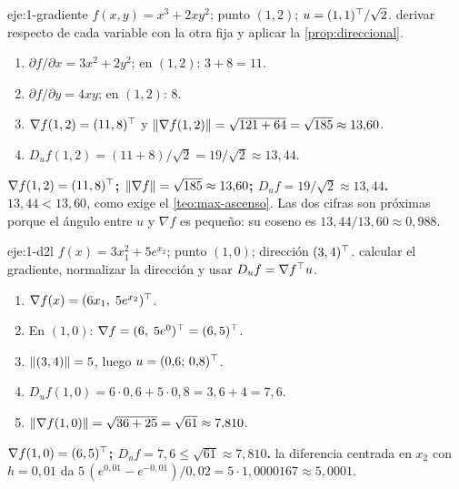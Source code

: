 \begin{solucion}{eje:1-gradiente}
\datos $f(x,y)=x^{3}+2xy^{2}$; punto $(1,2)$; $u=(1,1)^{\top}/\sqrt2$.
\planteamiento derivar respecto de cada variable con la otra fija y aplicar la \cref{prop:direccional}.
\pasos
\begin{enumerate}[label=\arabic*.]
  \item $\partial f/\partial x=3x^{2}+2y^{2}$; en $(1,2)$: $3+8=11$.
  \item $\partial f/\partial y=4xy$; en $(1,2)$: $8$.
  \item $\nabla f(1,2)=(11,8)^{\top}$ y $\lVert\nabla f(1,2)\rVert=\sqrt{121+64}=\sqrt{185}\approx 13{,}60$.
  \item $D_uf(1,2)=(11+8)/\sqrt2=19/\sqrt2\approx 13{,}44$.
\end{enumerate}
\resultado \textbf{$\nabla f(1,2)=(11,8)^{\top}$; $\lVert\nabla f\rVert=\sqrt{185}\approx 13{,}60$; $D_uf=19/\sqrt2\approx 13{,}44$.}
\comprobacion $13{,}44<13{,}60$, como exige el \cref{teo:max-ascenso}. Las dos cifras son próximas porque el ángulo entre $u$ y $\nabla f$ es pequeño: su coseno es $13{,}44/13{,}60\approx 0{,}988$.
\end{solucion}

\begin{solucion}{eje:1-d2l}
\datos $f(x)=3x_1^{2}+5e^{x_2}$; punto $(1,0)$; dirección $(3,4)^{\top}$.
\planteamiento calcular el gradiente, normalizar la dirección y usar $D_uf=\nabla f^{\top} u$.
\pasos
\begin{enumerate}[label=\arabic*.]
  \item $\nabla f(x)=(6x_1,\;5e^{x_2})^{\top}$.
  \item En $(1,0)$: $\nabla f=(6,\;5e^{0})^{\top}=(6,5)^{\top}$.
  \item $\lVert(3,4)\rVert=5$, luego $u=(0{,}6;\,0{,}8)^{\top}$.
  \item $D_uf(1,0)=6\cdot 0{,}6+5\cdot 0{,}8=3{,}6+4=7{,}6$.
  \item $\lVert\nabla f(1,0)\rVert=\sqrt{36+25}=\sqrt{61}\approx 7{,}810$.
\end{enumerate}
\resultado \textbf{$\nabla f(1,0)=(6,5)^{\top}$; $D_uf=7{,}6\le\sqrt{61}\approx 7{,}810$.}
\comprobacion la diferencia centrada en $x_2$ con $h=0{,}01$ da $5\,(e^{0{,}01}-e^{-0{,}01})/0{,}02=5\cdot 1{,}0000167\approx 5{,}0001$.
\end{solucion}

